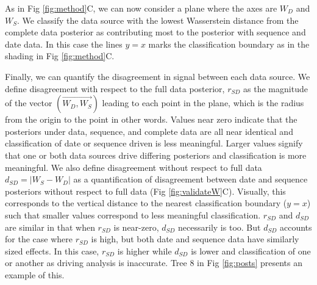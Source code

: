 \documentclass{article}
\begin{document}
As in Fig \ref{fig:method}C, we can now consider a plane where the axes are $W_{D}$ and $W_{S}$. We classify the data source with the lowest Wasserstein distance from the complete data posterior as contributing most to the posterior with sequence and date data. In this case the lines $y=x$ marks the classification boundary as in the shading in Fig \ref{fig:method}C.

Finally, we can quantify the disagreement in signal between each data source. We define disagreement with respect to the full data posterior, $r_{SD}$ as the magnitude of the vector $(\overrightarrow{W_{D}, W_{S}})$ leading to each point in the plane, which is the radius from the origin to the point in other words. Values near zero indicate that the posteriors under data, sequence, and complete data are all near identical and classification of date or sequence driven is less meaningful. Larger values signify that one or both data sources drive differing posteriors and classification is more meaningful. We also define disagreement without respect to full data $d_{SD} = | W_{S} - W_{D} |$ as a quantification of disagreement between date and sequence posteriors without respect to full data (Fig \ref{fig:validateW}C). Visually, this corresponds to the vertical distance to the nearest classification boundary ($y=x$) such that smaller values correspond to less meaningful classification. $r_{SD}$ and $d_{SD}$ are similar in that when $r_{SD}$ is near-zero,  $d_{SD}$ necessarily is too. But $d_{SD}$ accounts for the case where $r_{SD}$ is high, but both date and sequence data have similarly sized effects. In this case, $r_{SD}$ is higher while $d_{SD}$ is lower and classification of one or another as driving analysis is inaccurate. Tree 8 in Fig \ref{fig:posts} presents an example of this.
\end{document}
